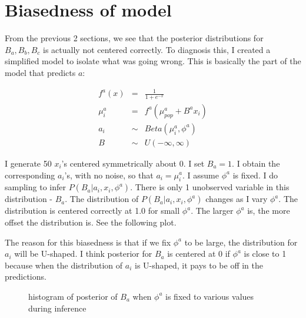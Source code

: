 \section{Biasedness of model}

From the previous 2 sections, we see that the posterior distributions for $B_a,B_b,B_c$ is actually not centered correctly.  To diagnosis this, I created a simplified model to isolate what was going wrong.  This is basically the part of the model that predicts $a$: 

\begin{eqnarray}
f^a(x) &=& \frac{1}{1+e^{-x}} \\
\mu_i^a &=& f^a(\mu_{pop}^a + B^ax_i) \\
a_i &\sim& Beta(\mu_i^a, \phi^a) \\
B &\sim& U(-\infty,\infty)
\end{eqnarray}

I generate 50 $x_i$'s centered symmetrically about 0.  I set $B_a=1$.  I obtain the corresponding $a_i$'s, with no noise, so that $a_i=\mu_i^a$.  I assume $\phi^a$ is fixed.  I do sampling to infer $P(B_a|a_i,x_i,\phi^a)$.  There is only 1 unobserved variable in this distribution - $B_a$.  The distribution of $P(B_a|a_i,x_i,\phi^a)$ changes as I vary $\phi^a$.  The distribution is centered correctly at 1.0 for small $\phi^a$.  The larger $\phi^a$ is, the more offset the distribution is.  See the following plot.

The reason for this biasedness is that if we fix $\phi^a$ to be large, the distribution for $a_i$ will be U-shaped.  I think posterior for $B_a$ is centered at 0 if $\phi^a$ is close to 1 because when the distribution of $a_i$ is U-shaped, it pays to be off in the predictions.  

\begin{figure}
\centering
\begin{subfigure}[$\phi^a=0.9$]{
  \texttt{[image: /Users/glareprotector/Documents/prostate/hist09.png]}}
\end{subfigure}
\begin{subfigure}[$\phi^a=0.5$]{
  \texttt{[image: /Users/glareprotector/Documents/prostate/hist05.png]}}
\end{subfigure}
\begin{subfigure}[$\phi^a=0.2$]{
  \texttt{[image: /Users/glareprotector/Documents/prostate/hist02.png]}}
\end{subfigure}
\begin{subfigure}[$\phi^a=0.01$]{
  \texttt{[image: /Users/glareprotector/Documents/prostate/hist001.png]}}
\end{subfigure}
\caption{histogram of posterior of $B_a$ when $\phi^a$ is fixed to various values during inference}
\end{figure}

